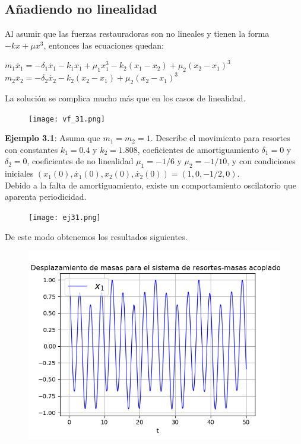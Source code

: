\documentclass{article}
\begin{document}
\subsection{Añadiendo no linealidad}
Al asumir que las fuerzas restauradoras son no lineales y tienen la forma $-kx+\mu x^{3}$, entonces las ecuaciones quedan:\\
\begin{center}
$m_{1}\ddot{x_{1}}=-\delta_{1}\dot{x_{1}}-k_{1}x_{1}+\mu_{1}x_{1}^{3}-k_{2}(x_{1}-x_{2})+\mu_{2}(x_{2}-x_{1})^{3}$\\
$m_{2}\ddot{x_{2}}=-\delta_{2}\dot{x_{2}}-k_{2}(x_{2}-x_{1})+\mu_{2}(x_{2}-x_{1})^{3}$\\
\end{center}
La solución se complica mucho más que en los casos de linealidad.\\
\begin{figure}[H]
	\centering
    \texttt{[image: vf\_31.png]}\\
\end{figure}
\textbf{Ejemplo 3.1}: Asuma que $m_{1}=m_{2}=1$. Describe el movimiento para resortes con constantes $k_{1}=0.4$ y $k_{2}=1.808$, coeficientes de amortiguamiento $\delta_{1}=0$ y $\delta_{2}=0$, coeficientes de no linealidad $\mu_{1}=-1/6$ y $\mu_{2}=-1/10$, y con condiciones iniciales $(x_{1}(0),\dot{x_{1}}(0),x_{2}(0),\dot{x_{2}}(0))=(1,0,-1/2,0)$.\\
Debido a la falta de amortiguamiento, existe un comportamiento oscilatorio que aparenta periodicidad.\\
\begin{figure}[H]
	\centering
    \texttt{[image: ej31.png]}
\end{figure}
De este modo obtenemos los resultados siguientes.
\begin{figure}[H]
	\centering
    \includegraphics[width=\linewidth]{31_d1.png}
\end{figure}
\end{document}
